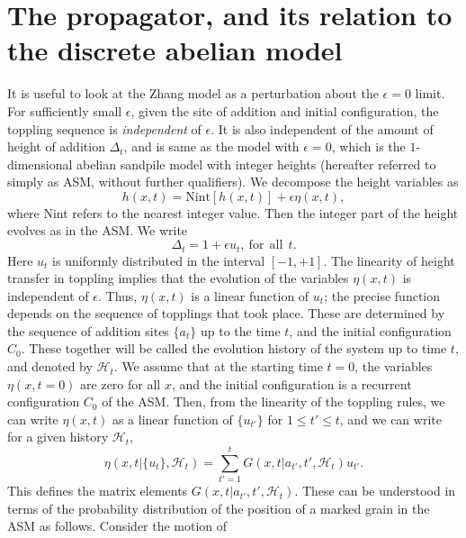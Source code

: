 \documentclass[11pt,a4paper]{book}
\begin{document}
\section{The propagator, and its  relation to the discrete abelian model} \label{ch4.3}
It is useful to look at the Zhang model as a perturbation about the 
$\epsilon =0$ limit.  For sufficiently small $\epsilon$, given the site of 
addition and initial configuration,  the toppling sequence is {\it 
independent} of $\epsilon$.  It is also 
independent of the amount of height of addition $\Delta_t$, and is same as 
the model with $\epsilon = 0$, which is the $1$-dimensional abelian 
sandpile model with integer heights (hereafter referred to simply as 
ASM, without  further 
qualifiers).  
We decompose the height variables as
\begin{equation}
\label{eq:1}
  h(x,t)=\mbox{Nint}[h(x,t)] + \epsilon \eta(x,t),
\end{equation}
where Nint refers to the nearest integer value. Then the integer part of 
the height evolves as in the ASM. We write
\begin{equation}
\Delta_t = 1 + \epsilon u_t , \mathrm{~for ~~all~~}t.
\end{equation}
Here $u_t$ is uniformly distributed in the interval $[-1,+1]$. The 
linearity of height transfer in toppling implies that the evolution of the 
variables $\eta(x,t)$ is independent of $\epsilon$. Thus, $\eta(x,t)$ is a 
linear function of $u_t$; the precise function depends on the sequence 
of topplings that took place. These are determined by the sequence of
addition sites $\{a_t\}$ up to the time $t$, and the initial configuration 
$C_0$. These together will be called the evolution history of the 
system up to time $t$, and denoted by  $\mathcal{H}_t$. We assume that at 
the starting time $t = 0$, the 
variables $\eta(x, t=0)$ are zero for all $x$, and the initial 
configuration is a recurrent configuration $C_0$ of the ASM. Then, from 
the linearity of the toppling rules, we can write $\eta(x,t)$ as a 
linear function of $\{u_{t'}\}$ for $1 \leq t' \le t$, and we can write for 
a given history $\mathcal{H}_t$,
\begin{equation}
  \label{eq:3}
  \eta(x,t|\{u_t\},\mathcal{H}_t)=  
  \sum_{t'=1}^{t}G(x,t|a_{t'},t',\mathcal{H}_t)u_{t'}.
\end{equation}
This defines the matrix elements $G(x,t|a_{t'},t',\mathcal{H}_t)$. These 
can be understood in terms of the probability distribution of the 
position of a marked grain in the ASM as follows. Consider the motion of 
\end{document}
